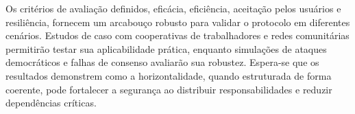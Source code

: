 Os critérios de avaliação definidos, eficácia, eficiência, aceitação pelos
usuários e resiliência, fornecem um arcabouço robusto para validar o protocolo em
diferentes cenários. Estudos de caso com cooperativas de trabalhadores e redes
comunitárias permitirão testar sua aplicabilidade prática, enquanto simulações
de ataques democráticos e falhas de consenso avaliarão sua robustez. Espera-se
que os resultados demonstrem como a horizontalidade, quando estruturada de forma
coerente, pode fortalecer a segurança ao distribuir responsabilidades e reduzir
dependências críticas.